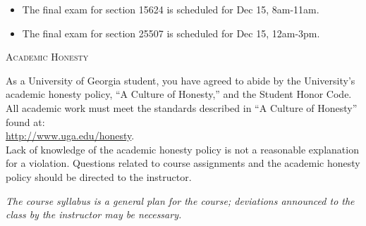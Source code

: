 \documentclass[12pt]{amsart}
\begin{document}
\smallskip
\begin{itemize}
\item The final exam for section 15624 is scheduled for Dec 15, 8am-11am.
\item The final exam for section 25507 is scheduled for Dec 15, 12am-3pm.
\end{itemize}

\medskip

\noindent
\textsc{Academic Honesty}

As a University of Georgia student, you have agreed to abide by the
University’s academic honesty policy, ``A Culture of Honesty,'' and the
Student Honor Code.  All academic work must meet the standards described in
``A Culture of Honesty'' found at: 
\\ \url{http://www.uga.edu/honesty}.  
\\
Lack
of knowledge of the academic honesty policy is not a reasonable explanation
for a violation.  Questions related to course assignments and the academic
honesty policy should be directed to the instructor.



\smallskip

\textit{The course syllabus is a general plan for the course; deviations
announced to the class by the instructor may be necessary.}
\end{document}
